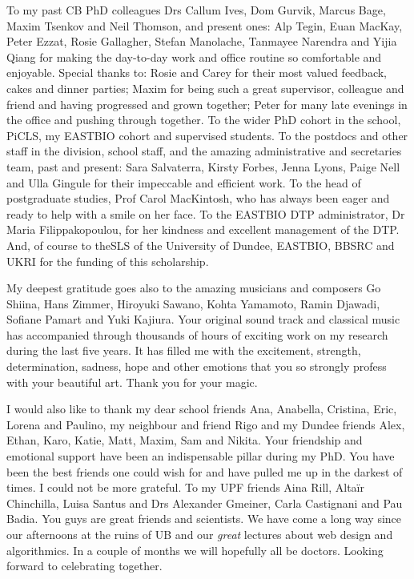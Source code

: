 To my past CB PhD colleagues Drs Callum Ives, Dom Gurvik, Marcus Bage, Maxim Tsenkov and Neil Thomson, and present ones: Alp Tegin, Euan MacKay, Peter Ezzat, Rosie Gallagher, Stefan Manolache, Tanmayee Narendra and Yijia Qiang for making the day-to-day work and office routine so comfortable and enjoyable. Special thanks to: Rosie and Carey for their most valued feedback, cakes and dinner parties; Maxim for being such a great supervisor, colleague and friend and having progressed and grown together; Peter for many late evenings in the office and pushing through together. To the wider PhD cohort in the school, PiCLS, my EASTBIO cohort and supervised students. To the postdocs and other staff in the division, school staff, and the amazing administrative and secretaries team, past and present: Sara Salvaterra, Kirsty Forbes, Jenna Lyons, Paige Nell and Ulla Gingule for their impeccable and efficient work. To the head of postgraduate studies, Prof Carol MacKintosh, who has always been eager and ready to help with a smile on her face. To the EASTBIO DTP administrator, Dr Maria Filippakopoulou, for her kindness and excellent management of the DTP. And, of course to theSLS of the University of Dundee, EASTBIO, BBSRC and UKRI for the funding of this scholarship.

My deepest gratitude goes also to the amazing musicians and composers Go Shiina, Hans Zimmer, Hiroyuki Sawano, Kohta Yamamoto, Ramin Djawadi, Sofiane Pamart and Yuki Kajiura. Your original sound track and classical music has accompanied through thousands of hours of exciting work on my research during the last five years. It has filled me with the excitement, strength, determination, sadness, hope and other emotions that you so strongly profess with your beautiful art. Thank you for your magic.

I would also like to thank my dear school friends Ana, Anabella, Cristina, Eric, Lorena and Paulino, my neighbour and friend Rigo and my Dundee friends Alex, Ethan, Karo, Katie, Matt, Maxim, Sam and Nikita. Your friendship and emotional support have been an indispensable pillar during my PhD. You have been the best friends one could wish for and have pulled me up in the darkest of times. I could not be more grateful. To my UPF friends Aina Rill, Altaïr Chinchilla, Luisa Santus and Drs Alexander Gmeiner, Carla Castignani and Pau Badia. You guys are great friends and scientists. We have come a long way since our afternoons at the ruins of UB and our \textit{great} lectures about web design and algorithmics. In a couple of months we will hopefully all be doctors. Looking forward to celebrating together.

